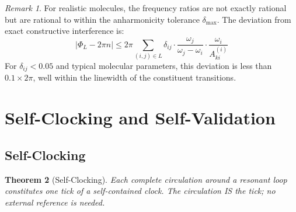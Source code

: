 \documentclass[11pt,a4paper]{article}
\newtheorem{theorem}{Theorem}[section]
\theoremstyle{definition}
\theoremstyle{remark}
\newtheorem{remark}[theorem]{Remark}
\newcommand{\Aki}{A_{ki}}
\begin{document}
\begin{remark}
For realistic molecules, the frequency ratios are not exactly rational but are rational to within the anharmonicity tolerance $\delta_{\max}$. The deviation from exact constructive interference is:
\begin{equation}
|\Phi_L - 2\pi n| \leq 2\pi \sum_{(i,j) \in L} \delta_{ij} \cdot \frac{\omega_j}{\omega_j - \omega_i} \cdot \frac{\omega_i}{\Aki^{(i)}}
\end{equation}
For $\delta_{ij} < 0.05$ and typical molecular parameters, this deviation is less than $0.1 \times 2\pi$, well within the linewidth of the constituent transitions.
\end{remark}

\section{Self-Clocking and Self-Validation}
\label{sec:self_clocking}

\subsection{Self-Clocking}

\begin{theorem}[Self-Clocking]
\label{thm:self_clocking}
Each complete circulation around a resonant loop constitutes one tick of a self-contained clock. The circulation IS the tick; no external reference is needed.
\end{theorem}
\end{document}
